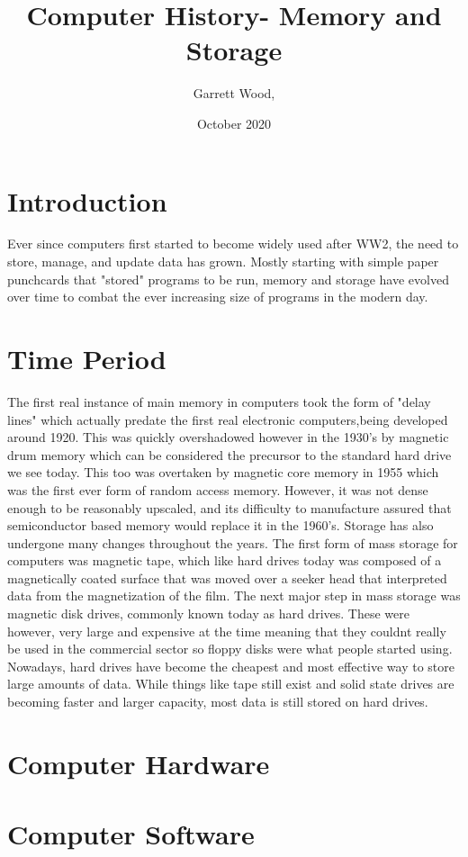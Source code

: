 \documentclass{article}
\title{Computer History- Memory and Storage}
\author{Garrett Wood, }
\date{October 2020}
\begin{document}
\maketitle

\section{Introduction}
Ever since computers first started to become widely used after WW2, the need to store, manage, and update data has grown. Mostly starting with simple paper punchcards that "stored" programs to be run, memory and storage have evolved over time to combat the ever increasing size of programs in the modern day.
\section{Time Period}
The first real instance of main memory in computers took the form of "delay lines" which actually predate the first real electronic computers,being developed around 1920. This was quickly overshadowed however in the 1930's by magnetic drum memory which can be considered the precursor to the standard hard drive we see today. This too was overtaken by magnetic core memory in 1955 which was the first ever form of random access memory. However, it was not dense enough to be reasonably upscaled, and its difficulty to manufacture assured that semiconductor based memory would replace it in the 1960's. Storage has also undergone many changes throughout the years. 
The first form of mass storage for computers was magnetic tape, which like hard drives today was composed of a magnetically coated surface that was moved over a seeker head that interpreted data from the magnetization of the film. The next major step in mass storage was magnetic disk drives, commonly known today as hard drives. These were however, very large and expensive at the time meaning that they couldnt really be used in the commercial sector so floppy disks were what people started using. Nowadays, hard drives have become the cheapest and most effective way to store large amounts of data. While things like tape still exist and solid state drives are becoming faster and larger capacity, most data is still stored on hard drives.

\section{Computer Hardware}

\section{Computer Software}
\end{document}
